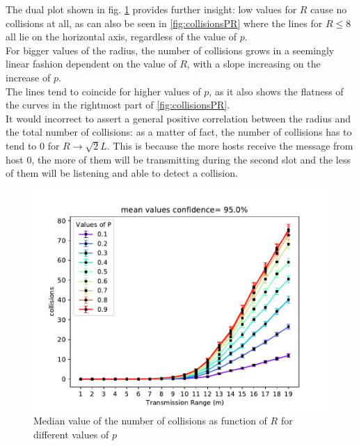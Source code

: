 The dual plot shown in fig. \ref{fig:collisionsRP} provides further insight: low values for $R$ cause no collisions at all, as can also be seen in \ref{fig:collisionsPR} where the lines for $R \leq 8$ all lie on the horizontal axis, regardless of the value of $p$.\\
For bigger values of the radius, the number of collisions grows in a seemingly linear fashion dependent on the value of $R$, with a slope increasing on the increase of $p$.\\
The lines tend to coincide for higher values of $p$, as it also shows the flatness of the curves in the rightmost part of \ref{fig:collisionsPR}.\\
It would incorrect to assert a general positive correlation between the radius and the total number of collisions: as a matter of fact, the number of collisions has to tend to 0 for $R \to \sqrt{2}L$. This is because the more hosts receive the message from host 0, the more of them will be transmitting during the second slot and the less of them will be listening and able to detect a collision.
\begin{figure}[H]
    \begin{center}
        \includegraphics[scale=.7]{img/big_collisions_r_mean_95.0.pdf}
    \end{center}
    \vspace*{-0.5cm}
    \caption{Median value of the number of collisions as function of $R$ for different values of $p$}
    \label{fig:collisionsRP}
\end{figure}
